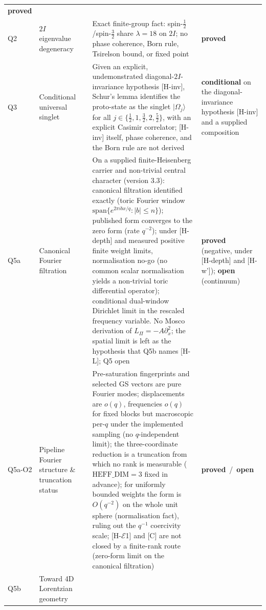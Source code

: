 \documentclass[11pt,a4paper]{article}
\newcommand{\sproved}{\textcolor{cproved}{\textbf{proved}}}
\newcommand{\sopen}{\textcolor{copen}{\textbf{open}}}
\newcommand{\scond}{\textcolor{ccond}{\textbf{conditional}}}
\begin{document}
\begin{longtable}{@{}p{1.70cm}p{2.9cm}p{1.3cm}p{6.25cm}>{\raggedright\arraybackslash}p{2.0cm}@{}}
      \sproved \\[3pt]
      Q2 & $2I$ eigenvalue degeneracy & \cite{Beau2026q2} &
      Exact finite-group fact: spin-$\tfrac{1}{2}$/spin-$\tfrac{3}{2}$ share
      $\lambda=18$ on $2I$; no phase coherence, Born rule, Tsirelson bound, or fixed point &
      \sproved \\[3pt]
      Q3 & Conditional universal singlet & \cite{Beau2026q3} &
      Given an explicit, undemonstrated diagonal-$2I$-invariance hypothesis [H-inv], Schur's
      lemma identifies the proto-state as the singlet $|\Omega_j\rangle$ for all
      $j \in \{\tfrac{1}{2},1,\tfrac{3}{2},2,\tfrac{5}{2}\}$, with an explicit Casimir
      correlator; [H-inv] itself, phase coherence, and the Born rule are not derived &
      \scond{} on the diagonal-invariance hypothesis [H-inv] and a supplied composition \\[3pt]
      Q5a & Canonical Fourier filtration & \cite{Beau2026q5a} &
      On a supplied finite-Heisenberg carrier and non-trivial central character (version 3.3): canonical
      filtration identified exactly (toric Fourier window
      $\mathrm{span}\{e^{2\pi i b x/q}: |b|\le n\}$); published form converges to the zero form
      (rate $q^{-2}$); under [H-depth] and measured positive finite weight limits, normalisation
      no-go (no common scalar normalisation yields a non-trivial toric differential operator);
      conditional dual-window Dirichlet limit in the
      rescaled frequency variable.
      No Mosco derivation of $L_\Pi=-A\partial_x^2$; the spatial limit is left as the hypothesis that Q5b
      names [H-L]; Q5 open &
      \sproved{} (negative, under [H-depth] and [H-w']); \sopen{} (continuum) \\[3pt]
      Q5a-O2 & Pipeline Fourier structure \& truncation status & \cite{Beau2026q5ao2} &
      Pre-saturation fingerprints and selected GS vectors are pure Fourier modes;
      displacements are $o(q)$, frequencies $o(q)$ for fixed blocks but macroscopic per-$q$
      under the implemented sampling (no $q$-independent limit); the three-coordinate
      reduction is a truncation from which no rank is measurable ($\mathrm{HEFF\_DIM}=3$
      fixed in advance); for uniformly bounded weights the form is $O(q^{-2})$ on the whole
      unit sphere (normalisation fact), ruling out the $q^{-1}$ coercivity scale; [H-$\mathcal{E}$1] and [C]
      are not closed by a finite-rank route (zero-form limit on the canonical filtration) &
      \sproved\ /\ \sopen \\[3pt]
      Q5b & Toward 4D Lorentzian geometry & \cite{Beau2026q5b} &

\end{longtable}
\end{document}
